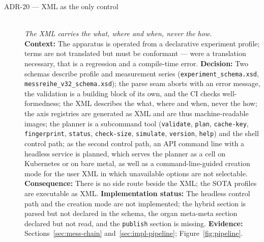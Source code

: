 \begin{description}
  \item[ADR-20 --- XML as the only control]\hfill\\
  \emph{The XML carries the what, where and when, never the how.}\hfill\\
  \textbf{Context:} The apparatus is operated from a declarative experiment profile; terms are not
  translated but must be conformant --- were a translation necessary, that is a regression and a
  compile-time error.
  \textbf{Decision:} Two schemas describe profile and measurement series
  (\texttt{experiment\_schema.xsd}, \texttt{messreihe\_v32\_schema.xsd}); the parse seam aborts
  with an error message, the validation is a building block of its own, and the CI checks
  well-formedness; the XML describes the what, where and when, never the how; the axis registries
  are generated as XML and are thus machine-readable images; the planner is a subcommand tool
  (\texttt{validate}, \texttt{plan}, \texttt{cache-key}, \texttt{fingerprint}, \texttt{status},
  \texttt{check-size}, \texttt{simulate}, \texttt{version}, \texttt{help}) and the shell control
  path; as the second control path, an API command line with a headless service is planned, which
  serves the planner as a cell on Kubernetes or on bare metal, as well as a command-line-guided
  creation mode for the user XML in which unavailable options are not selectable.
  \textbf{Consequence:} There is no side route beside the XML\@; the SOTA profiles are executable
  as XML\@.
  \textbf{Implementation status:} The headless control path and the creation mode are not
  implemented; the hybrid section is parsed but not declared in the schema, the organ meta-meta
  section declared but not read, and the \texttt{publish} section is missing.
  \textbf{Evidence:} Sections~\ref{sec:mess-chain} and~\ref{sec:impl-pipeline};
  Figure~\ref{fig:pipeline}.

\end{description}
